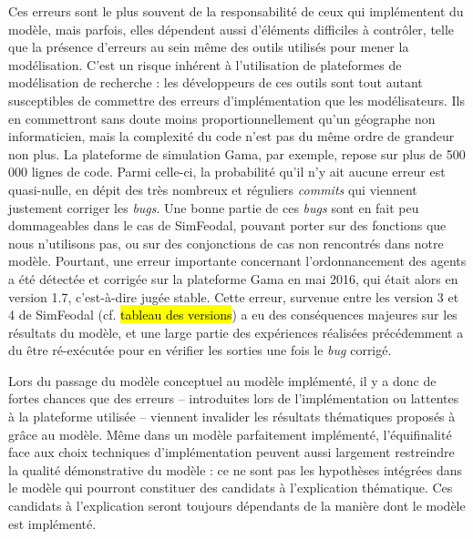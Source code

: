 Ces erreurs sont le plus souvent de la responsabilité de ceux qui implémentent du modèle, mais parfois, elles dépendent aussi d'éléments difficiles à contrôler, telle que la présence d'erreurs au sein même des outils utilisés pour mener la modélisation.
C'est un risque inhérent à l'utilisation de plateformes de modélisation \og de recherche\fg{} : les développeurs de ces outils sont tout autant susceptibles de commettre des erreurs d'implémentation que les modélisateurs.
Ils en commettront sans doute moins proportionnellement qu'un géographe non informaticien, mais la complexité du code n'est pas du même ordre de grandeur non plus.
La plateforme de simulation Gama, par exemple, repose sur plus de 500 000 lignes de code.
Parmi celle-ci, la probabilité qu'il n'y ait aucune erreur est quasi-nulle, en dépit des très nombreux et réguliers \textit{commits} qui viennent justement corriger les \textit{bugs}.
Une bonne partie de ces \textit{bugs} sont en fait peu dommageables dans le cas de SimFeodal, pouvant porter sur des fonctions que nous n'utilisons pas, ou sur des conjonctions de cas non rencontrés dans notre modèle.
Pourtant, une erreur importante concernant l'ordonnancement des agents a été détectée et corrigée sur la plateforme Gama en mai 2016, qui était alors en version 1.7, c'est-à-dire jugée stable.
Cette erreur, survenue entre les version 3 et 4 de SimFeodal (cf. \hl{tableau des versions}) a eu des conséquences majeures sur les résultats du modèle, et une large partie des expériences réalisées précédemment a du être ré-exécutée pour en vérifier les sorties une fois le \textit{bug} corrigé.

Lors du passage du modèle conceptuel au modèle implémenté, il y a donc de fortes chances que des erreurs -- introduites lors de l'implémentation ou lattentes à la plateforme utilisée -- viennent invalider les résultats thématiques proposés à grâce au modèle.
Même dans un modèle parfaitement implémenté, l'équifinalité face aux choix techniques d'implémentation peuvent aussi largement restreindre la qualité démonstrative du modèle : ce ne sont pas les hypothèses intégrées dans le modèle qui pourront constituer des candidats à l'explication thématique.
Ces candidats à l'explication seront toujours dépendants de la manière dont le modèle est implémenté.

